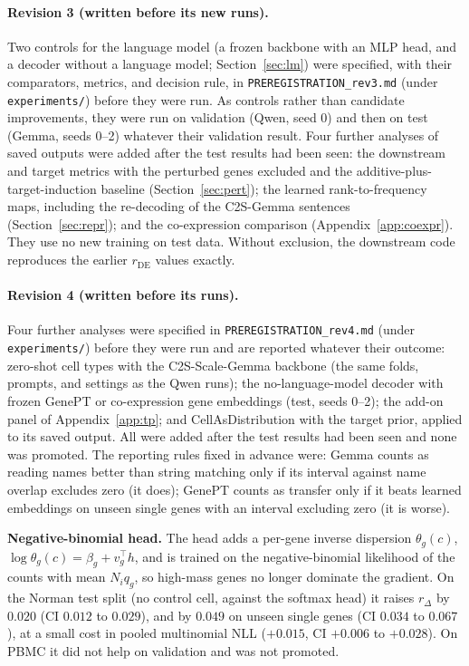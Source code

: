 \documentclass[10pt]{article}
\makeatletter
\newcommand{\cad}{CellAsDistribution}
\renewcommand\section{\@startsection{section}{1}{\z@}{-3.5ex \@plus -1ex \@minus -.2ex}{2.3ex \@plus.2ex}{\normalfont\Large\bfseries\raggedright\hyphenpenalty=10000}}
\makeatother
\begin{document}
\paragraph{Revision 3 (written before its new runs).} Two controls for the language model (a frozen backbone with an MLP head, and a decoder without a language model; Section~\ref{sec:lm}) were specified, with their comparators, metrics, and decision rule, in \texttt{PREREGISTRATION\_rev3.md} (under \texttt{experiments/}) before they were run. As controls rather than candidate improvements, they were run on validation (Qwen, seed 0) and then on test (Gemma, seeds 0--2) whatever their validation result. Four further analyses of saved outputs were added after the test results had been seen: the downstream and target metrics with the perturbed genes excluded and the additive-plus-target-induction baseline (Section~\ref{sec:pert}); the learned rank-to-frequency maps, including the re-decoding of the C2S-Gemma sentences (Section~\ref{sec:repr}); and the co-expression comparison (Appendix~\ref{app:coexpr}). They use no new training on test data. Without exclusion, the downstream code reproduces the earlier $r_{\mathrm{DE}}$ values exactly.

\paragraph{Revision 4 (written before its runs).} Four further analyses were specified in \texttt{PREREGISTRATION\_rev4.md} (under \texttt{experiments/}) before they were run and are reported whatever their outcome: zero-shot cell types with the C2S-Scale-Gemma backbone (the same folds, prompts, and settings as the Qwen runs); the no-language-model decoder with frozen GenePT or co-expression gene embeddings (test, seeds 0--2); the add-on panel of Appendix~\ref{app:tp}; and \cad{} with the target prior, applied to its saved output. All were added after the test results had been seen and none was promoted. The reporting rules fixed in advance were: Gemma counts as reading names better than string matching only if its interval against name overlap excludes zero (it does); GenePT counts as transfer only if it beats learned embeddings on unseen single genes with an interval excluding zero (it is worse).

\FloatBarrier
\section{Negative-binomial and low-rank heads}\label{app:heads}
\textbf{Negative-binomial head.} The head adds a per-gene inverse dispersion $\theta_g(c)$, $\log\theta_g(c)=\beta_g+v_g^\top h$, and is trained on the negative-binomial likelihood of the counts with mean $N_iq_g$, so high-mass genes no longer dominate the gradient. On the Norman test split (no control cell, against the softmax head) it raises $r_\Delta$ by $0.020$ (CI $0.012$ to $0.029$), and by $0.049$ on unseen single genes (CI $0.034$ to $0.067$), at a small cost in pooled multinomial NLL ($+0.015$, CI $+0.006$ to $+0.028$). On PBMC it did not help on validation and was not promoted.
\end{document}
